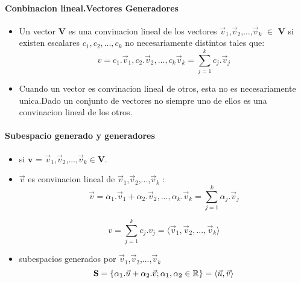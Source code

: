 \documentclass[a4paper]{article}
\begin{document}
\paragraph{Conbinacion lineal.Vectores Generadores}
\begin{itemize}
	\item Un vector $\textbf{V}$ es una convinacion lineal de los vectores $\vec{v}_1$,$\vec{v}_2$,...,$\vec{v}_k$ $\in$ $\textbf{V}$ si existen escalares $c_1,c_2,...,c_k$ no necesariamente distintos tales que:
	\begin{equation}
		v = c_1.\vec{v}_1,c_2.\vec{v}_2,...,c_k\vec{v}_k = \sum_{j=1}^{k} c_j.\vec{v}_j
	\end{equation}
	\item Cuando un vector es convinacion lineal de otros, esta no es necesariamente unica.Dado un conjunto de vectores no siempre uno de ellos es una convinacion lineal de los otros.
\end{itemize}
\paragraph{Subespacio generado y generadores}
\begin{itemize}
	\item si $\textbf{v}$ = $\vec{v}_1$,$\vec{v}_2$,...,$\vec{v}_k \in \textbf{V}$.  
	\item $\vec{v}$ es convinacion lineal de $\vec{v}_1$,$\vec{v}_2$,...,$\vec{v}_k$ :	
	\begin{equation}
		\vec{v} = \alpha_1.\vec{v}_1+\alpha_2.\vec{v}_2,...,\alpha_k.\vec{v}_k =  \sum_{j=1}^{k} \alpha_j.\vec{v}_j
	\end{equation}
			
	\begin{equation}
	 v = \sum_{j=1}^{k} c_j.v_j = \langle\vec{v}_1,\vec{v}_2,...,\vec{v}_k\rangle
	\end{equation}	 
	
	\item subespacios generados por $\vec{v}_1$,$\vec{v}_2$,...,$\vec{v}_k$
	\begin{equation}
		\textbf{S} = \lbrace \alpha_1.\vec{u}+\alpha_2.\vec{v};\alpha_1,\alpha_2 \in \Bbb{R}\rbrace = \langle \vec{u},\vec{v}\rangle
	\end{equation}
\end{itemize}
\end{document}
